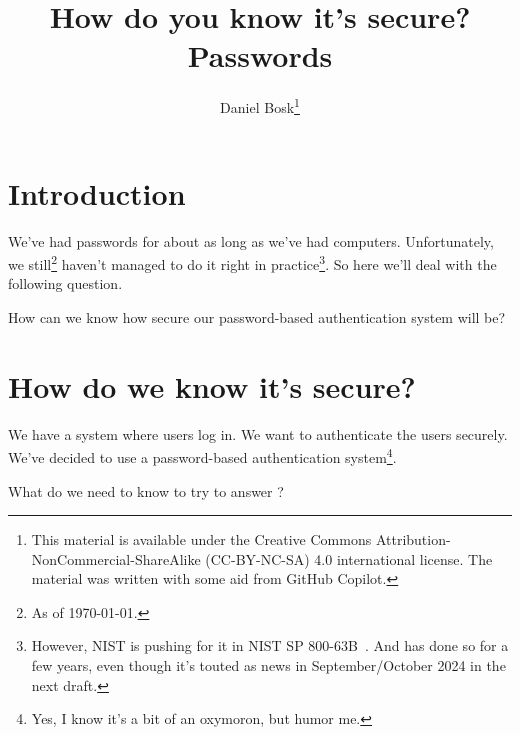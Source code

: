 \title{%
  How do you know it's secure?
  Passwords
}
\author{Daniel Bosk\thanks{%
    This material is available under the Creative Commons 
    Attribution-NonCommercial-ShareAlike (CC-BY-NC-SA) 4.0 international 
    license.
    The material was written with some aid from GitHub Copilot.
}}

\begin{frame}
  \maketitle
\end{frame}

\mode*

\begin{abstract}
  
\end{abstract}

\clearpage

\section<article>{Introduction}

We've had passwords for about as long as we've had computers.
Unfortunately, we still\footnote{As of \today.} haven't managed to do it right 
in practice\footnote{%
  However, NIST is pushing for it in NIST SP 800-63B~\autocite{NIST80063B}.
  And has done so for a few years, even though it's touted as news in 
  September/October 2024 in the next draft.
}.
So here we'll deal with the following question.

\begin{question}\label{RQ}
  How can we know how secure our password-based authentication system will be?
\end{question}


\section[How do we know?]{How do we know it's secure?}

\begin{frame}
We have a system where users log in.
We want to authenticate the users securely.
We've decided to use a password-based authentication system\footnote{%
  Yes, I know it's a bit of an oxymoron, but humor me.
}.

  \begin{exercise}
    What do we need to know to try to answer
    ?
  \end{exercise}
\end{frame}


